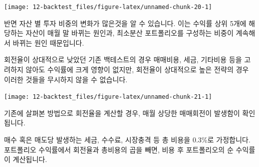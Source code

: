\documentclass[12pt,]{book}
\newenvironment{Shaded}{\begin{snugshade}}{\end{snugshade}}
\newcommand{\DataTypeTok}[1]{\textcolor[rgb]{0.13,0.29,0.53}{#1}}
\newcommand{\FloatTok}[1]{\textcolor[rgb]{0.00,0.00,0.81}{#1}}
\newcommand{\KeywordTok}[1]{\textcolor[rgb]{0.13,0.29,0.53}{\textbf{#1}}}
\newcommand{\NormalTok}[1]{#1}
\newcommand{\OperatorTok}[1]{\textcolor[rgb]{0.81,0.36,0.00}{\textbf{#1}}}
\newcommand{\OtherTok}[1]{\textcolor[rgb]{0.56,0.35,0.01}{#1}}
\newcommand{\StringTok}[1]{\textcolor[rgb]{0.31,0.60,0.02}{#1}}
\begin{document}
\begin{center}\texttt{[image: 12-backtest\_files/figure-latex/unnamed-chunk-20-1]} \end{center}

반면 자산 별 투자 비중의 변화가 많은것을 알 수 있습니다. 이는 수익률 상위 5개에 해당하는 자산이 매월 말 바뀌는 원인과, 최소분산 포트폴리오를 구성하는 비중이 계속해서 바뀌는 원인 때문입니다.

회전율이 상대적으로 낮았던 기존 백테스트의 경우 매매비용, 세금, 기타비용 등을 고려하지 않아도 수익률에 크게 영향이 없지만, 회전율이 상대적으로 높은 전략의 경우 이러한 것들을 무시하지 않을 수 없습니다.

\begin{Shaded}
\end{Shaded}

\begin{center}\texttt{[image: 12-backtest\_files/figure-latex/unnamed-chunk-21-1]} \end{center}

기존에 살펴본 방법으로 회전율을 계산할 경우, 매월 상당한 매매회전이 발생함이 확인됩니다.

\begin{Shaded}
\end{Shaded}

매수 혹은 매도당 발생하는 세금, 수수료, 시장충격 등 총 비용을 0.3\%로 가정합니다. 포트폴리오 수익률에서 회전율과 총비용의 곱을 빼면, 비용 후 포트폴리오의 순 수익률이 계산됩니다.
\end{document}
